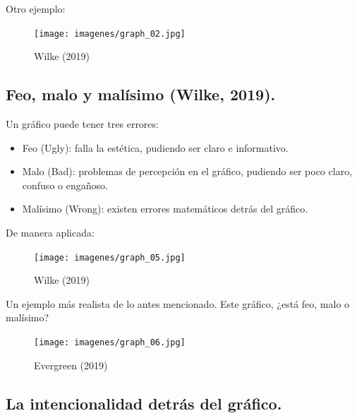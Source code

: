 \documentclass[
  letterpaper,
  DIV=11,
  numbers=noendperiod]{scrartcl}
\begin{document}
Otro ejemplo:

\begin{figure}[H]

{\centering \texttt{[image: imagenes/graph\_02.jpg]}

}

\caption{Wilke (2019)}

\end{figure}

\hypertarget{feo-malo-y-maluxedsimo-wilke-2019.}{%
\subsection{Feo, malo y malísimo (Wilke,
2019).}\label{feo-malo-y-maluxedsimo-wilke-2019.}}

Un gráfico puede tener tres errores:

\begin{itemize}
\item
  Feo (Ugly): falla la estética, pudiendo ser claro e informativo.
\item
  Malo (Bad): problemas de percepción en el gráfico, pudiendo ser poco
  claro, confuso o engañoso.
\item
  Malísimo (Wrong): existen errores matemáticos detrás del gráfico.
\end{itemize}

De manera aplicada:

\begin{figure}[H]

{\centering \texttt{[image: imagenes/graph\_05.jpg]}

}

\caption{Wilke (2019)}

\end{figure}

Un ejemplo más realista de lo antes mencionado. Este gráfico, ¿está feo,
malo o malísimo?

\begin{figure}[H]

{\centering \texttt{[image: imagenes/graph\_06.jpg]}

}

\caption{Evergreen (2019)}

\end{figure}

\hypertarget{la-intencionalidad-detruxe1s-del-gruxe1fico.}{%
\subsection{La intencionalidad detrás del
gráfico.}\label{la-intencionalidad-detruxe1s-del-gruxe1fico.}}
\end{document}
